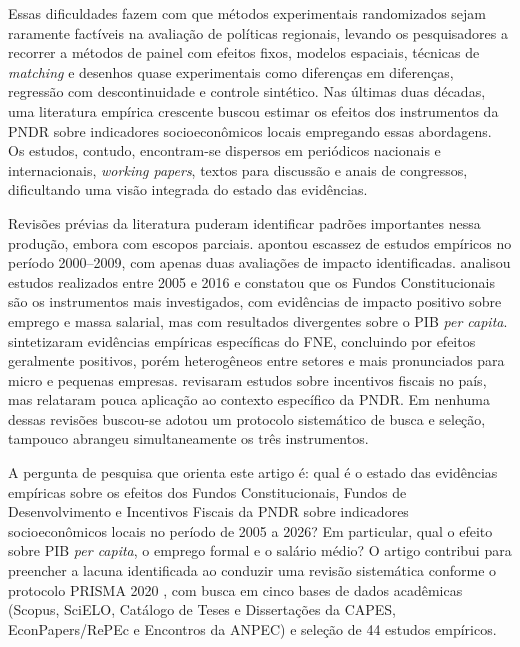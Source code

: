 Essas dificuldades fazem com que métodos experimentais randomizados sejam raramente factíveis na avaliação de políticas regionais, levando os pesquisadores a recorrer a métodos de painel com efeitos fixos, modelos espaciais, técnicas de \textit{matching} e desenhos quase experimentais como diferenças em diferenças, regressão com descontinuidade e controle sintético. Nas últimas duas décadas, uma literatura empírica crescente buscou estimar os efeitos dos instrumentos da PNDR sobre indicadores socioeconômicos locais empregando essas abordagens. Os estudos, contudo, encontram-se dispersos em periódicos nacionais e internacionais, \textit{working papers}, textos para discussão e anais de congressos, dificultando uma visão integrada do estado das evidências.

Revisões prévias da literatura puderam identificar padrões importantes nessa produção, embora com escopos parciais.  apontou escassez de estudos empíricos no período 2000--2009, com apenas duas avaliações de impacto identificadas.  analisou estudos realizados entre 2005 e 2016 e constatou que os Fundos Constitucionais são os instrumentos mais investigados, com evidências de impacto positivo sobre emprego e massa salarial, mas com resultados divergentes sobre o PIB \textit{per capita}.  sintetizaram evidências empíricas específicas do FNE, concluindo por efeitos geralmente positivos, porém heterogêneos entre setores e mais pronunciados para micro e pequenas empresas.  revisaram estudos sobre incentivos fiscais no país, mas relataram pouca aplicação ao contexto específico da PNDR. Em nenhuma dessas revisões buscou-se adotou um protocolo sistemático de busca e seleção, tampouco abrangeu simultaneamente os três instrumentos.

A pergunta de pesquisa que orienta este artigo é: qual é o estado das evidências empíricas sobre os efeitos dos Fundos Constitucionais, Fundos de Desenvolvimento e Incentivos Fiscais da PNDR sobre indicadores socioeconômicos locais no período de 2005 a 2026? Em particular, qual o efeito sobre PIB \textit{per capita}, o emprego formal e o salário médio? O artigo contribui para preencher a lacuna identificada ao conduzir uma revisão sistemática conforme o protocolo PRISMA 2020 \cite{Page2021}, com busca em cinco bases de dados acadêmicas (Scopus, SciELO, Catálogo de Teses e Dissertações da CAPES, EconPapers/RePEc e Encontros da ANPEC) e seleção de 44 estudos empíricos.

